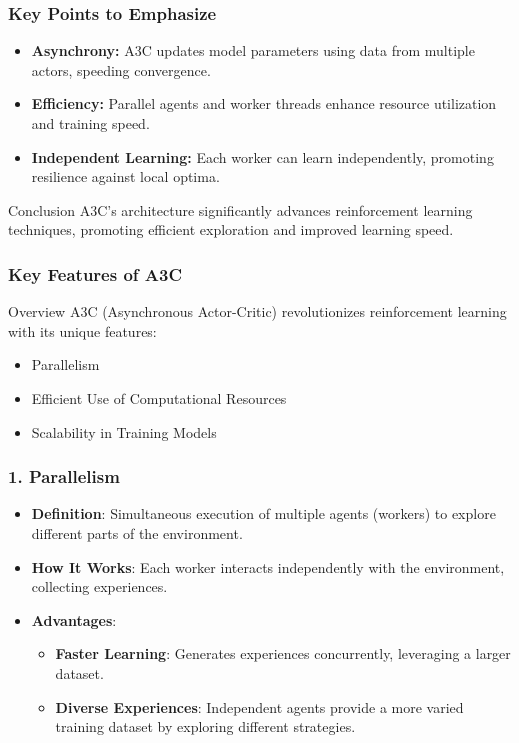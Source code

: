 \documentclass{beamer}
\begin{document}
\begin{frame}[fragile]
    \frametitle{Key Points to Emphasize}
    
    \begin{itemize}
        \item \textbf{Asynchrony:} A3C updates model parameters using data from multiple actors, speeding convergence.
        \item \textbf{Efficiency:} Parallel agents and worker threads enhance resource utilization and training speed.
        \item \textbf{Independent Learning:} Each worker can learn independently, promoting resilience against local optima.
    \end{itemize}
    
    \begin{block}{Conclusion}
        A3C's architecture significantly advances reinforcement learning techniques, promoting efficient exploration and improved learning speed.
    \end{block}
\end{frame}

\begin{frame}[fragile]
    \frametitle{Key Features of A3C}
    \begin{block}{Overview}
        A3C (Asynchronous Actor-Critic) revolutionizes reinforcement learning with its unique features:
        \begin{itemize}
            \item Parallelism
            \item Efficient Use of Computational Resources
            \item Scalability in Training Models
        \end{itemize}
    \end{block}
\end{frame}

\begin{frame}[fragile]
    \frametitle{1. Parallelism}
    \begin{itemize}
        \item \textbf{Definition}: Simultaneous execution of multiple agents (workers) to explore different parts of the environment.
        \item \textbf{How It Works}: Each worker interacts independently with the environment, collecting experiences.
        \item \textbf{Advantages}:
        \begin{itemize}
            \item \textbf{Faster Learning}: Generates experiences concurrently, leveraging a larger dataset.
            \item \textbf{Diverse Experiences}: Independent agents provide a more varied training dataset by exploring different strategies.
        \end{itemize}
    \end{itemize}
\end{frame}
\end{document}
